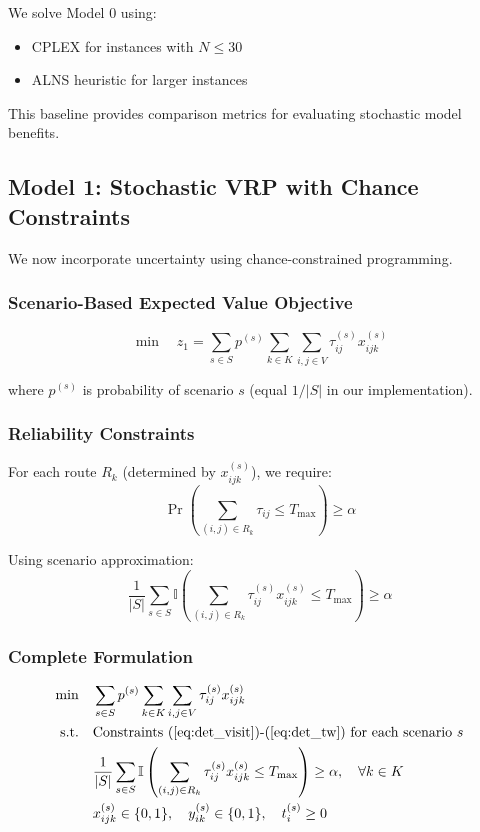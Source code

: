 We solve Model 0 using:
\begin{itemize}
\item CPLEX for instances with $N \leq 30$
\item ALNS heuristic for larger instances
\end{itemize}

This baseline provides comparison metrics for evaluating stochastic model benefits.

\subsection{Model 1: Stochastic VRP with Chance Constraints}

We now incorporate uncertainty using chance-constrained programming.

\subsubsection{Scenario-Based Expected Value Objective}

\begin{equation}
\min \quad z_1 = \sum_{s \in S} p^{(s)} \sum_{k \in K} \sum_{i,j \in V} \tau_{ij}^{(s)} x_{ijk}^{(s)}
\end{equation}

where $p^{(s)}$ is probability of scenario $s$ (equal $1/|S|$ in our implementation).

\subsubsection{Reliability Constraints}

For each route $R_k$ (determined by $x_{ijk}^{(s)}$), we require:
\begin{equation}
\Pr\left(\sum_{(i,j) \in R_k} \tau_{ij} \leq T_{\max}\right) \geq \alpha
\end{equation}

Using scenario approximation:
\begin{equation}
\frac{1}{|S|} \sum_{s \in S} \mathbb{I}\left(\sum_{(i,j) \in R_k} \tau_{ij}^{(s)} x_{ijk}^{(s)} \leq T_{\max}\right) \geq \alpha
\end{equation}

\subsubsection{Complete Formulation}

\begin{align}
\min \quad & \sum_{s \in S} p^{(s)} \sum_{k \in K} \sum_{i,j \in V} \tau_{ij}^{(s)} x_{ijk}^{(s)} \\
\text{s.t.} \quad & \text{Constraints (\ref{eq:det_visit})-(\ref{eq:det_tw}) for each scenario } s \\
& \frac{1}{|S|} \sum_{s \in S} \mathbb{I}\left(\sum_{(i,j) \in R_k} \tau_{ij}^{(s)} x_{ijk}^{(s)} \leq T_{\max}\right) \geq \alpha, \quad \forall k \in K \\
& x_{ijk}^{(s)} \in \{0,1\}, \quad y_{ik}^{(s)} \in \{0,1\}, \quad t_i^{(s)} \geq 0
\end{align}

